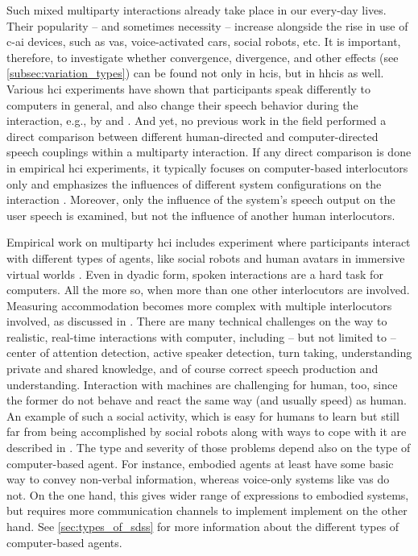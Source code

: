 Such mixed multiparty interactions already take place in our every-day lives.
Their popularity -- and sometimes necessity -- increase alongside the rise in use of \ac{c-ai} devices, such as \acp{va}, voice-activated cars, social robots, etc.
It is important, therefore, to investigate whether convergence, divergence, and other effects (see \cref{subsec:variation_types}) can be found not only in \aclp{hci}, but in \acp{hhci} as well.
Various \ac{hci} experiments have shown that participants speak differently to computers in general, and also change their speech behavior during the interaction, e.g., by \citet{Branigan2010linguistic} and \citet{Levitan2016implementing}.
And yet, no previous work in the field performed a direct comparison between different human-directed and computer-directed speech couplings within a multiparty interaction.
If any direct comparison is done in empirical \ac{hci} experiments, it typically focuses on computer-based interlocutors only and emphasizes the influences of different system configurations on the interaction \citep[e.g.,][]{Levitan2016implementing}.
Moreover, only the influence of the system's speech output on the user speech is examined, but not the influence of another human interlocutors.

Empirical work on multiparty \ac{hci} includes experiment where participants interact with different types of agents, like social robots \citep[as in][]{Foster2012two,Ibrahim2019fundamental} and human avatars in immersive virtual worlds \citep[e.g.,][]{Traum2002embodied}.
Even in dyadic form, spoken interactions are a hard task for computers.
All the more so, when more than one other interlocutors are involved.
Measuring accommodation becomes more complex with multiple interlocutors involved, as discussed in \citet{Rahimi2019acoustic}.
There are many technical challenges on the way to realistic, real-time interactions with computer, including -- but not limited to -- center of attention detection, active speaker detection, turn taking, understanding private and shared knowledge, and of course correct speech production and understanding.
Interaction with machines are challenging for human, too, since the former do not behave and react the same way (and usually speed) as human.
An example of such a social activity, which is easy for humans to learn but still far from being accomplished by social robots along with ways to cope with it are described in \citet{Jonel2018Farmi}.
The type and severity of those problems depend also on the type of computer-based agent.
For instance, embodied agents at least have some basic way to convey non-verbal information, whereas voice-only systems like \acp{va} do not.
On the one hand, this gives wider range of expressions to embodied systems, but requires more communication channels to implement implement on the other hand.
See \cref{sec:types_of_sdss} for more information about the different types of computer-based agents.

